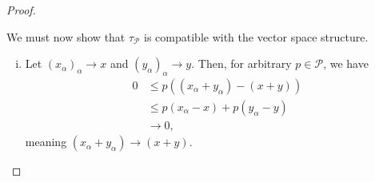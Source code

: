 \documentclass[10pt]{mypackage}
\begin{document}
\begin{proof}
\begin{enumerate}[(1)]
      We must now show that $\tau_{\mathcal{P}}$ is compatible with the vector space structure.
      \begin{enumerate}[(i)]
        \item Let $\left(x_{\alpha}\right)_{\alpha}\rightarrow x$ and $\left(y_{\alpha}\right)_{\alpha}\rightarrow y$. Then, for arbitrary $p\in \mathcal{P}$, we have
          \begin{align*}
            0 &\leq p\left(\left(x_{\alpha} + y_{\alpha}\right) - \left(x+y\right)\right)\\
              &\leq p\left(x_{\alpha} - x\right) + p\left(y_{\alpha} - y\right)\\
              &\rightarrow 0,
          \end{align*}
          meaning $\left(x_{\alpha} + y_{\alpha}\right) \rightarrow \left(x+y\right)$.
      \end{enumerate}
  \end{enumerate}
\end{proof}
\end{document}
